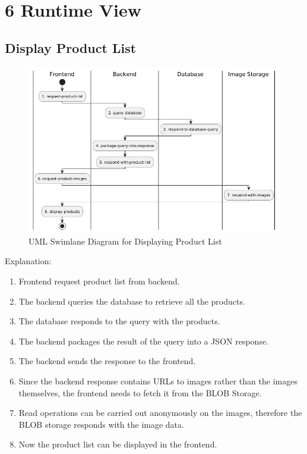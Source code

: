 \hypertarget{section-runtime-view}{%
\section{6 Runtime View}\label{section-runtime-view}}

\hypertarget{__runtime_scenario_1}{%
\subsection{Display Product List}\label{__runtime_scenario_1}}
\begin{figure}[h]
  \centering
  \includegraphics[width=\textwidth]{images/uml_swimlane_product_list.png}
  \caption{UML Swimlane Diagram for Displaying Product List}
\end{figure}

Explanation:
\begin{enumerate}
  \item Frontend request product list from backend.
  \item The backend queries the database to retrieve all the products.
  \item The database responds to the query with the products.
  \item The backend packages the result of the query into a JSON response.
  \item The backend sends the response to the frontend.
  \item Since the backend response contains URLs to images rather than the images themselves, the frontend needs to fetch it from the BLOB Storage.
  \item Read operations can be carried out anonymously on the images, therefore the BLOB storage responds with the image data.
  \item Now the product list can be displayed in the frontend.
\end{enumerate}


